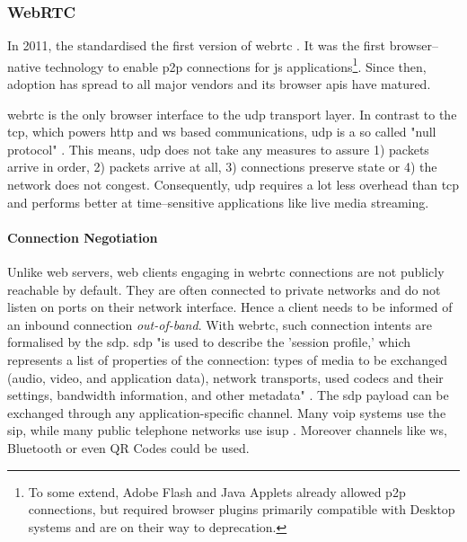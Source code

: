 \subsubsection{WebRTC}\label{sec:webrtc}

In 2011, the  standardised the first version of \gls{webrtc} \cite{webrtc-w3c}. It was the first browser–native technology to enable \gls{p2p} connections for \gls{js} applications\footnote{To some extend, Adobe Flash and Java Applets already allowed \gls{p2p} connections, but required browser plugins primarily compatible with Desktop systems and are on their way to deprecation.}. Since then, adoption has spread to all major vendors \cite{webrtc-browser-compat} and its browser \glspl{api} have matured.

\gls{webrtc} is the only browser interface to the \gls{udp} transport layer. In contrast to the \gls{tcp}, which powers \gls{http} and \gls{ws} based communications, \gls{udp} is a so called "null protocol" \cite[p. 36]{high-performance-browser-networking}. This means, \gls{udp} does not take any measures to assure 1) packets arrive in order, 2) packets arrive at all, 3) connections preserve state or 4) the network does not congest. Consequently, \gls{udp} requires a lot less overhead than \gls{tcp} and performs better at time–sensitive applications like live media streaming.

\paragraph{Connection Negotiation}\label{par:webrtc-con-negotiation}
Unlike web servers, web clients engaging in \gls{webrtc} connections are not publicly reachable by default. They are often connected to private networks and do not listen on ports on their network interface.
Hence a client needs to be informed of an inbound connection \textit{out-of-band}. With \gls{webrtc}, such connection intents are formalised by the \gls{sdp}. \gls{sdp} "is used to describe the 'session profile,' which represents a list of properties of the connection: types of media to be exchanged (audio, video, and application data), network transports, used codecs and their settings, bandwidth information, and other metadata" \cite[p. 323]{high-performance-browser-networking}.
The \gls{sdp} payload \cite[\S5]{sdp-rfc} can be exchanged through any application-specific channel. Many \gls{voip} systems use the \gls{sip}, while many public telephone networks use \gls{isup} \cite[p. 321]{high-performance-browser-networking}. Moreover channels like \gls{ws}, Bluetooth or even QR Codes could be used.

